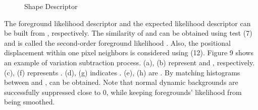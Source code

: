 \documentclass[a4paper,twocolumn, 10pt]{article}
\begin{document}
\begin{figure}[t]
  \centering
  \label{fig80}
  \hfill
  \caption{Shape Descriptor}
\end{figure}
The foreground likelihood descriptor   and the expected likelihood descriptor   can be built from  ,   respectively. The similarity of    and   can be obtained using   test (7) and is called the second-order foreground likelihood  . Also, the positional displacement within one pixel neighbors is considered using (12).
Figure 9 shows an example of variation subtraction process. (a), (b) represent   and  , respectively. (c), (f) represents  . (d), (g) indicates  . (e), (h) are  . By matching histograms between   and  ,   can be obtained. Note that normal dynamic backgrounds are successfully suppressed close to 0, while keeping foregrounds’ likelihood from being smoothed.
\end{document}
